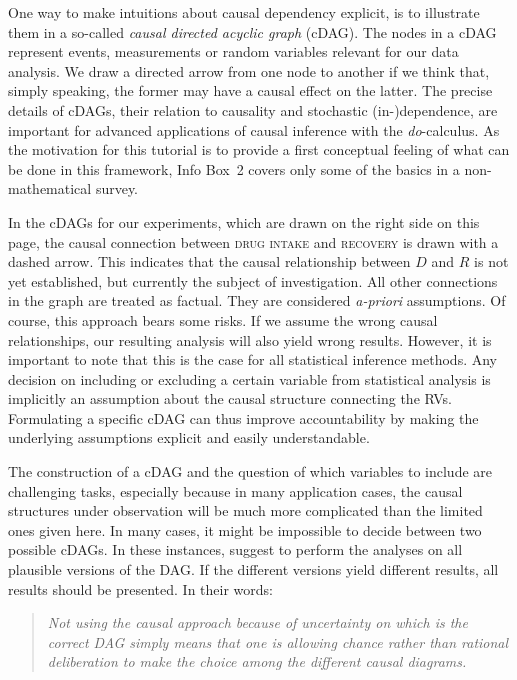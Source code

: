 \documentclass[nobib]{tufte-handout}
\newcommand{\docalc}{\emph{do}-calculus\xspace}
\begin{document}
One way to make intuitions about causal dependency explicit, is to illustrate them in a so-called \textit{causal directed acyclic graph} (cDAG).
The nodes in a cDAG represent events, measurements or random variables relevant for our data analysis.
We draw a directed arrow from one node to another if we think that, simply speaking, the former may have a causal effect on the latter. 
The precise details of cDAGs, their relation to causality and stochastic (in-)dependence, are important for advanced applications of causal inference with the \docalc.
As the motivation for this tutorial is to provide a first conceptual feeling of what can be done in this framework, Info Box~2 covers only some of the basics in a non-mathematical survey.

In the cDAGs for our experiments, which are drawn on the right side on this page, the causal connection between \textsc{drug intake} and \textsc{recovery} is drawn with a dashed arrow.
This indicates that the causal relationship between $D$ and $R$ is not yet established, but currently the subject of investigation.
All other connections in the graph are treated as factual.
They are considered \textit{a-priori} assumptions. 
Of course, this approach bears some risks.
If we assume the wrong causal relationships, our resulting analysis will also yield wrong results.
However, it is important to note that this is the case for all statistical inference methods.
Any decision on including or excluding a certain variable from statistical analysis is implicitly an assumption about the causal structure connecting the RVs.
Formulating a specific cDAG can thus improve accountability by making the underlying assumptions explicit and easily understandable.

The construction of a cDAG and the question of which variables to include are challenging tasks, especially because in many application cases, the causal structures under observation will be much more complicated than the limited ones given here.
In many cases, it might be impossible to decide between two possible cDAGs.
In these instances, \citet{shrier2008reducing} suggest to perform the analyses on all plausible versions of the DAG.
If the different versions yield different results, all results should be presented. 
In their words: 
\begin{quote}
\emph{
Not using the causal approach because of uncertainty on which is the correct DAG simply means that one is allowing chance rather than rational deliberation to make the choice among the different causal diagrams.    
}
\end{quote}
\end{document}
